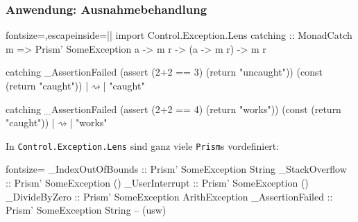 \documentclass{beamer}
\newcommand{\ev}{$\rightsquigarrow$} %
\begin{document}
\begin{frame}[fragile,t]
  \frametitle{Anwendung: Ausnahmebehandlung}
  \begin{haskellcode*}{fontsize=\small,escapeinside=||}
import Control.Exception.Lens
catching :: MonadCatch m => Prism' SomeException a
         -> m r -> (a -> m r) -> m r

catching _AssertionFailed (assert (2+2 == 3) (return "uncaught"))
                          (const (return "caught"))
|\ev| "caught"

catching _AssertionFailed (assert (2+2 == 4) (return "works"))
                          (const (return "caught"))
|\ev| "works"
  \end{haskellcode*}

  In \verb|Control.Exception.Lens| sind ganz viele \verb|Prism|s vordefiniert:
  \begin{minipage}{0.85 \linewidth}
    \begin{mdframed}[backgroundcolor=blue!10]
      \begin{haskellcode*}{fontsize=\footnotesize}
_IndexOutOfBounds :: Prism' SomeException String
_StackOverflow    :: Prism' SomeException ()
_UserInterrupt    :: Prism' SomeException ()
_DivideByZero     :: Prism' SomeException ArithException
_AssertionFailed  :: Prism' SomeException String
-- (usw)
      \end{haskellcode*}
    \end{mdframed}
  \end{minipage}
\end{frame}
\end{document}
